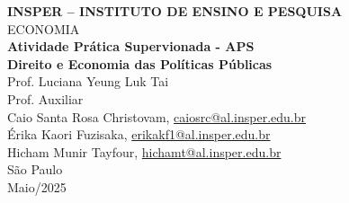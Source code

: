 \documentclass[a4paper,12pt]{article}[abntex2]
\begin{document}
\begin{titlepage}
    \centering
    \vspace*{1cm}
    \Large\textbf{INSPER – INSTITUTO DE ENSINO E PESQUISA}\\
    \Large ECONOMIA\\
    \vspace{1.5cm}
    \Large\textbf{Atividade Prática Supervionada - APS}\\
    \textbf{Direito e Economia das Políticas Públicas}\\
    \vspace{1.5cm}
    Prof. Luciana Yeung Luk Tai\\
    Prof. Auxiliar  \\
    \vfill
    \normalsize
    Caio Santa Rosa Christovam, \href{mailto:caiosrc@al.insper.edu.br}{caiosrc@al.insper.edu.br}\\
    Érika Kaori Fuzisaka, \href{mailto:erikakf1@al.insper.edu.br}{erikakf1@al.insper.edu.br}\\
    Hicham Munir Tayfour, \href{mailto:hichamt@al.insper.edu.br}{hichamt@al.insper.edu.br}\\
    \vfill
    São Paulo\\
    Maio/2025
\end{titlepage}

\newpage
\tableofcontents
\thispagestyle{empty} %

\newpage 
\listoffigures
\thispagestyle{empty} %

\newpage
\setcounter{page}{1} %
\justify
\onehalfspacing
\end{document}

